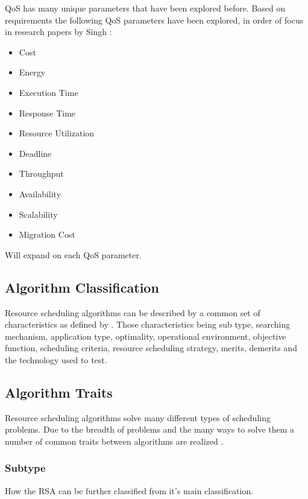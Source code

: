 \documentclass[12pt]{article}
\begin{document}
QoS has many unique parameters that have been explored before. Based on requirements the following QoS parameters have been explored, in order of focus in research papers by Singh \cite{Singh2016}:
\begin{itemize}
    \item Cost
    \item Energy
    \item Execution Time
    \item Response Time
    \item Resource Utilization
    \item Deadline
    \item Throughput
    \item Availability
    \item Scalability
    \item Migration Cost
\end{itemize}

Will expand on each QoS parameter.

\subsection{Algorithm Classification} \label{sub:algclassification}


Resource scheduling algorithms can be described by a common set of characteristics as defined by \textcite{Singh2016}. Those characteristics being sub type, searching mechanism, application type, optimality, operational environment, objective function, scheduling criteria, resource scheduling strategy, merits, demerits and the technology used to test.

\subsection{Algorithm Traits} \label{sub:algtraits}

Resource scheduling algorithms solve many different types of scheduling problems. Due to the breadth of problems and the many ways to solve them a number of common traits between algorithms are realized \cite{Singh2016}.

\subsubsection{Subtype} How the RSA can be further classified from it's main classification.
\end{document}
